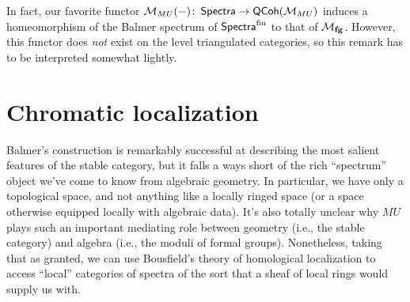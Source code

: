 \begin{remark}
In fact, our favorite functor $\mathcal{M}_{MU}(-)\colon\thinspace \mathsf{Spectra} \to \mathsf{QCoh}(\mathcal{M}_{MU})$ induces a homeomorphism of the Balmer spectrum of $\mathsf{Spectra}^{\mathrm{fin}}$ to that of $\mathcal{M}_{\mathbf{fg}}$.  However, this functor does \emph{not} exist on the level triangulated categories, so this remark has to be interpreted somewhat lightly.
\end{remark}





\section{Chromatic localization}

Balmer's construction is remarkably successful at describing the most salient features of the stable category, but it falls a ways short of the rich ``spectrum'' object we've come to know from algebraic geometry.  In particular, we have only a topological space, and not anything like a locally ringed space (or a space otherwise equipped locally with algebraic data).  It's also totally unclear why $MU$ plays such an important mediating role between geometry (i.e., the stable category) and algebra (i.e., the moduli of formal groups).
Nonetheless, taking that as granted, we can use Bousfield's theory of homological localization to access ``local'' categories of spectra of the sort that a sheaf of local rings would supply us with.

